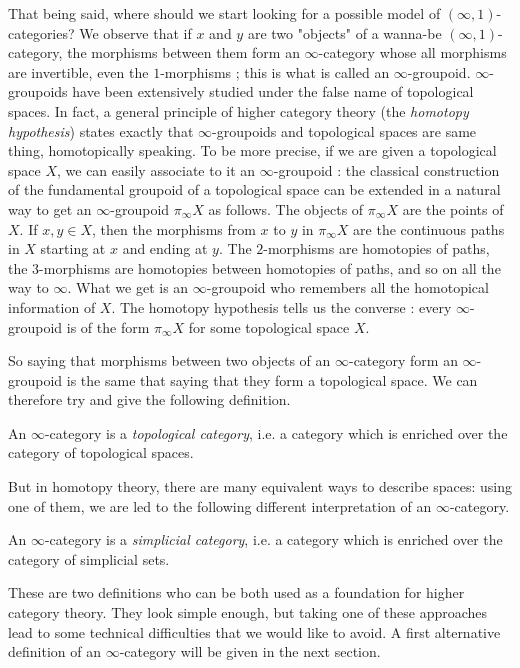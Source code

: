That being said, where should we start looking for a possible model of $(\infty,1)$-categories? We observe that if $x$ and $y$ are two "objects" of a wanna-be $(\infty,1)$-category, the morphisms between them form an $\infty$-category whose all morphisms are invertible, even the $1$-morphisms ; this is what is called an $\infty$-groupoid.
$\infty$-groupoids have been extensively studied under the false name of topological spaces. In fact, a general principle of higher category theory (the \emph{homotopy hypothesis}) states exactly that $\infty$-groupoids and topological spaces are same thing, homotopically speaking. To be more precise, if we are given a topological space $X$, we can easily associate to it an $\infty$-groupoid : the classical construction of the fundamental groupoid of a topological space can be extended in a natural way to get an $\infty$-groupoid $\pi_{\infty}X$ as follows. The objects of $\pi_{\infty}X$ are the points of $X$. If $x,y \in X$, then the morphisms from $x$ to $y$ in $\pi_{\infty}X$ are the continuous paths in $X$ starting at $x$ and ending at $y$. The $2$-morphisms are homotopies of paths, the $3$-morphisms are homotopies between homotopies of paths, and so on all  the way to $\infty$. What we get is an $\infty$-groupoid who remembers all the homotopical information of $X$. The homotopy hypothesis tells us the converse : every $\infty$-groupoid is of the form $\pi_{\infty}X$ for some topological space $X$.

So saying that morphisms between two objects of an $\infty$-category form an $\infty$-groupoid is the same that saying that they form a topological space. We can therefore try and give the following definition.

\begin{defin}
An $\infty$-category is a \emph{topological category}, i.e. a category which is enriched over the category of topological spaces.
\end{defin}

But in homotopy theory, there are many equivalent ways to describe spaces: using one of them, we are led to the following different interpretation of an $\infty$-category.

\begin{defin}
An $\infty$-category is a \emph{simplicial category}, i.e. a category which is enriched over the category of simplicial sets.
\end{defin}

These are two definitions who can be both used as a foundation for higher category theory. They look simple enough, but taking one of these approaches lead to some technical difficulties that we would like to avoid. A first alternative definition of an $\infty$-category will be given in the next section.

